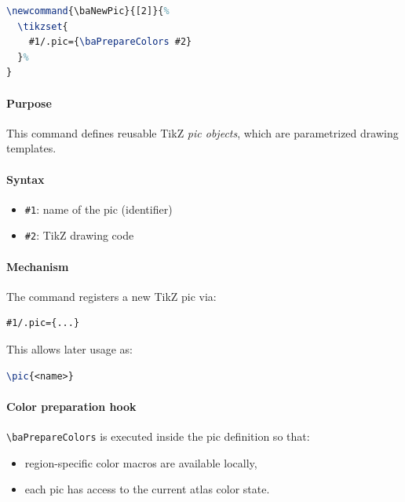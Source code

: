 \begin{lstlisting}[language=LaTeX]
\newcommand{\baNewPic}{[2]}{%
  \tikzset{
    #1/.pic={\baPrepareColors #2}
  }%
}
\end{lstlisting}

\paragraph{Purpose}

This command defines reusable TikZ \emph{pic objects}, which are parametrized drawing templates.

\paragraph{Syntax}

\begin{itemize}
\item \texttt{\#1}: name of the pic (identifier)
\item \texttt{\#2}: TikZ drawing code
\end{itemize}

\paragraph{Mechanism}

The command registers a new TikZ pic via:

\begin{lstlisting}[language=LaTeX]
#1/.pic={...}
\end{lstlisting}

This allows later usage as:

\begin{lstlisting}[language=LaTeX]
\pic{<name>}
\end{lstlisting}

\paragraph{Color preparation hook}

\lstinline|\baPrepareColors| is executed inside the pic definition so that:

\begin{itemize}
\item region-specific color macros are available locally,
\item each pic has access to the current atlas color state.
\end{itemize}

